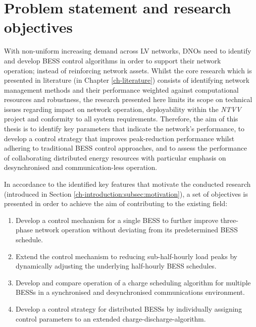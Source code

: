 \section{Problem statement and research objectives}
\label{ch-introduction:sec:problem-statement}

With non-uniform increasing demand across LV networks, DNOs need to identify and develop BESS control algorithms in order to support their network operation; instead of reinforcing network assets.
Whilst the core research which is presented in literature (in Chapter \ref{ch-literature}) consists of identifying network management methods and their performance weighted against computational resources and robustness, the research presented here limits its scope on technical issues regarding impact on network operation, deployability within the \textit{NTVV} project and conformity to all system requirements.
Therefore, the aim of this thesis is to identify key parameters that indicate the network's performance, to develop a control strategy that improves peak-reduction performance whilst adhering to traditional BESS control approaches, and to assess the performance of collaborating distributed energy resources with particular emphasis on desynchronised and communication-less operation.

In accordance to the identified key features that motivate the conducted research (introduced in Section \ref{ch-introduction:subsec:motivation}), a set of objectives is presented in order to achieve the aim of contributing to the existing field:

\begin{enumerate}
	\item Develop a control mechanism for a single BESS to further improve three-phase network operation without deviating from its predetermined BESS schedule.
	\item Extend the control mechanism to reducing sub-half-hourly load peaks by dynamically adjusting the underlying half-hourly BESS schedules.
	\item Develop and compare operation of a charge scheduling algorithm for multiple BESSs in a synchronised and desynchronised communications environment.
	\item Develop a control strategy for distributed BESSs by individually assigning control parameters to an extended charge-discharge-algorithm.
\end{enumerate}


